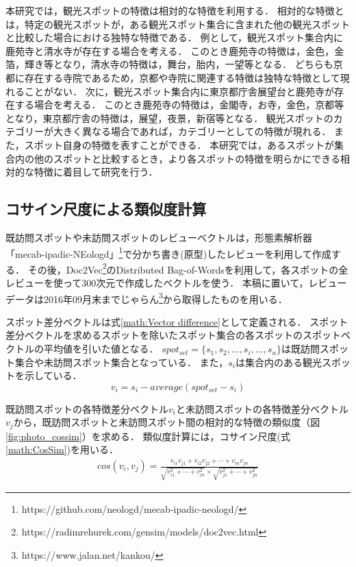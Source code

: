 \documentclass{deimj}
\begin{document}
本研究では，観光スポットの特徴は相対的な特徴を利用する．
相対的な特徴とは，特定の観光スポットが，ある観光スポット集合に含まれた他の観光スポットと比較した場合における独特な特徴である．
例として，観光スポット集合内に鹿苑寺と清水寺が存在する場合を考える．
このとき鹿苑寺の特徴は，金色，金箔，輝き等となり，清水寺の特徴は，舞台，胎内，一望等となる．
どちらも京都に存在する寺院であるため，京都や寺院に関連する特徴は独特な特徴として現れることがない．
次に，観光スポット集合内に東京都庁舎展望台と鹿苑寺が存在する場合を考える．
このとき鹿苑寺の特徴は，金閣寺，お寺，金色，京都等となり，東京都庁舎の特徴は，展望，夜景，新宿等となる．
観光スポットのカテゴリーが大きく異なる場合であれば，カテゴリーとしての特徴が現れる．
また，スポット自身の特徴を表すことができる．
本研究では，あるスポットが集合内の他のスポットと比較するとき，より各スポットの特徴を明らかにできる相対的な特徴に着目して研究を行う．

\subsection{コサイン尺度による類似度計算}
\label{subsec:Calculation of similarity by cosine similarity}
既訪問スポットや未訪問スポットのレビューベクトルは，形態素解析器「mecab-ipadic-NEologd」\footnote{https://github.com/neologd/mecab-ipadic-neologd/}で分かち書き(原型)したレビューを利用して作成する．
その後，Doc2Vec\footnote{https://radimrehurek.com/gensim/models/doc2vec.html}のDistributed Bag-of-Wordsを利用して，各スポットの全レビューを使って300次元で作成したベクトルを使う．
本稿に置いて，レビューデータは2016年09月末までじゃらん\footnote{https://www.jalan.net/kankou/}から取得したものを用いる．

スポット差分ベクトルは式\ref{math:Vector difference}として定義される．
スポット差分ベクトルを求めるスポットを除いたスポット集合の各スポットのスポットベクトルの平均値を引いた値となる．
$spot_{set} =\{s_1,s_2,\dots,s_i,\dots,s_n\}$は既訪問スポット集合や未訪問スポット集合となっている．
また，$s_i$は集合内のある観光スポットを示している．
\begin{equation}
  v_i=s_i-average(spot_{set}-s_i)
    \label{math:Vector difference}
\end{equation}

既訪問スポットの各特徴差分ベクトル$v_i$と未訪問スポットの各特徴差分ベクトル$v_j$から，既訪問スポットと未訪問スポット間の相対的な特徴の類似度（図\ref{fig:photo_cossim}）を求める．
類似度計算には，コサイン尺度(式\ref{math:CosSim})を用いる．
\begin{eqnarray}
cos(v_i,v_j)=\frac{v_{i1}v_{j1}+v_{i2}v_{j2}+\cdots+v_{in}v_{jn}}
{\sqrt{v^2_{i1}+\cdots+v^2_{in}}\times\sqrt{v^2_{j1}+\cdots+v^2_{jn}}}
\label{math:CosSim}
\end{eqnarray}
\end{document}
